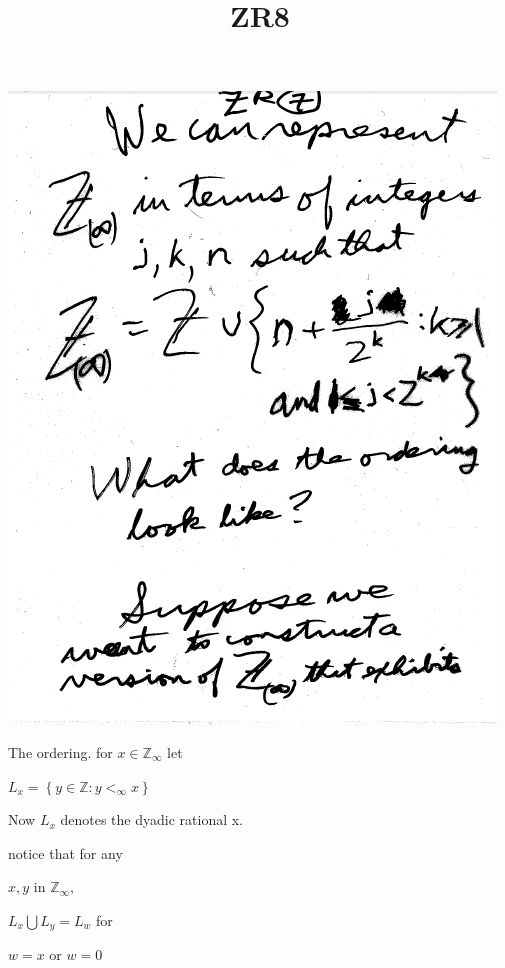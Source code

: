 \documentclass[10pt,a4paper]{article}
\begin{document}
{{\includegraphics[scale=0.6]{Pages/ZR7.png} 

\newpage 

\title{ZR8}

\maketitle 

The ordering. 
for $x\in \mathbb{Z}_{\infty}$ let 

$L_{x}=\left\{y\in\mathbb{Z}:y<_{\infty}x\right\}$

Now $L_{x}$ denotes the dyadic rational x. 

notice that for any 

$x,y$ in $\mathbb{Z}_{\infty},$ 

$L_{x} \bigcup L_{y} = L_{w}$ for 

$w=x$ or $w=0$ 

}}
\end{document}
